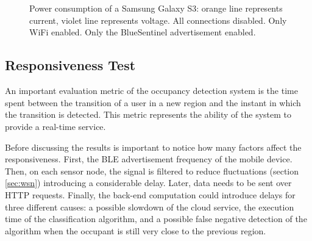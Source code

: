 \begin{figure}
     \centering
     \\
     \\
     \caption[Power consumption of a Samsung Galaxy S3.]{Power consumption of a Samsung Galaxy S3: orange line represents current, violet line represents voltage. \protect{} All connections disabled. \protect{} Only WiFi enabled. \protect{} Only the BlueSentinel advertisement enabled.}
      \label{fig:monsoon-graph}
\end{figure}




\subsection{Responsiveness Test}
\label{test-resp}
An important evaluation metric of the occupancy detection system is the time spent between the transition of a user in a new region and the instant in which the transition is detected. This metric represents the ability of the system to provide a real-time service.

Before discussing the results is important to notice how many factors affect the responsiveness. First, the BLE advertisement frequency of the mobile device. Then, on each sensor node, the signal is filtered to reduce fluctuations (section \ref{sec:wsn}) introducing a considerable delay. Later, data needs to be sent over HTTP requests. Finally, the back-end computation could introduce delays for three different causes: a possible slowdown of the cloud service, the execution time of the classification algorithm, and a possible false negative detection of the algorithm when the occupant is still very close to the previous region.

